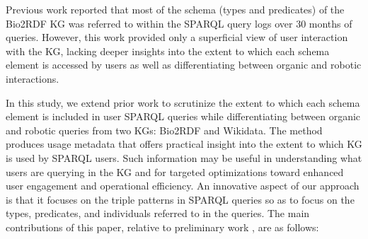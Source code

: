 \documentclass[sw]{iosart2x}
\begin{document}
Previous work \cite{mohammadi2024analyzing} reported that most of the schema (types and predicates) of the Bio2RDF KG was referred to within the SPARQL query logs over 30 months of queries. However, this work provided only a superficial view of user interaction with the KG, lacking deeper insights into the extent to which each schema element is accessed by users as well as differentiating between organic and robotic interactions. 

In this study, we extend prior work \cite{mohammadi2024analyzing} to scrutinize the extent to which each schema element is included in user SPARQL queries while differentiating between organic and robotic queries from two KGs: Bio2RDF and Wikidata. The method produces usage metadata that offers practical insight into the extent to which KG is used by SPARQL users. Such information may be useful in understanding what users are querying in the KG and for targeted optimizations toward enhanced user engagement and operational efficiency. 
An innovative aspect of our approach is that it focuses on the triple patterns in SPARQL queries so as to focus on the types, predicates, and individuals referred to in the queries. The main contributions of this paper, relative to preliminary work \cite{mohammadi2024analyzing}, are as follows:
\end{document}
